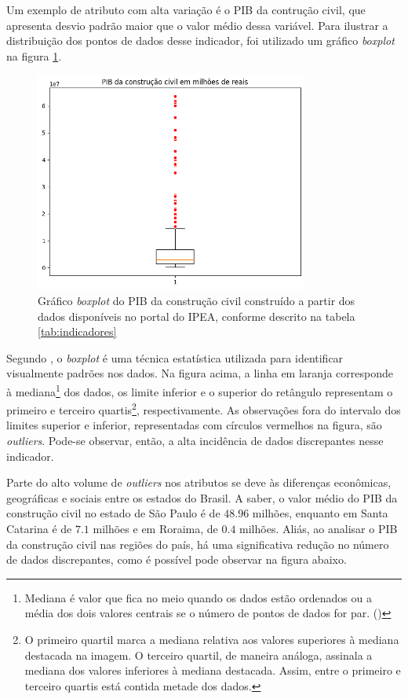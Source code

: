 Um exemplo de atributo com alta variação é o PIB da contrução civil,
que apresenta desvio padrão maior que o valor médio dessa variável.
Para ilustrar a distribuição dos pontos de dados desse indicador, foi utilizado 
um gráfico \textit{boxplot} na figura \ref{fig:boxplot_pibcc}.

\begin{figure}[H]
    \centering
    \includegraphics[width=9cm]{../figuras/graficos/boxplot-pib-cc.png}
    \caption{Gráfico \textit{boxplot} do PIB da construção civil construído a partir dos dados disponíveis no portal do IPEA, conforme descrito na tabela \ref{tab:indicadores}}
    \label{fig:boxplot_pibcc}
\end{figure}

Segundo \citet{boxplot}, o \textit{boxplot} é
uma técnica estatística utilizada para identificar visualmente padrões nos dados. 
Na figura acima, a linha em laranja corresponde à mediana\footnote{Mediana é
valor que fica no meio quando os dados estão ordenados ou a média
dos dois valores centrais se o número de pontos de dados for par.
(\cite{boxplot-stat})} 
dos dados, os limite inferior e o superior do retângulo representam
o primeiro e terceiro quartis\footnote{O primeiro quartil marca a mediana 
relativa aos valores superiores à mediana destacada na imagem. O terceiro quartil,
de maneira análoga, assinala a mediana dos valores inferiores à mediana destacada. 
Assim, entre o primeiro e terceiro quartis está contida metade
dos dados.}, respectivamente. As observações fora do intervalo dos limites 
superior e inferior, representadas com círculos vermelhos na figura, são 
\textit{outliers}. Pode-se observar, então, a alta incidência de dados discrepantes
nesse indicador.

Parte do alto volume de \textit{outliers} nos atributos se deve às diferenças
econômicas, geográficas e sociais entre os estados do Brasil. A saber, o valor 
médio do PIB da construção civil no estado 
de São Paulo é de $48.96$ milhões, enquanto em Santa Catarina é de $7.1$ milhões e 
em Roraima, de $0.4$ milhões. Aliás, ao analisar o PIB da construção civil nas 
regiões do país, há uma significativa redução no número de dados discrepantes, como é possível
pode observar na figura abaixo.

